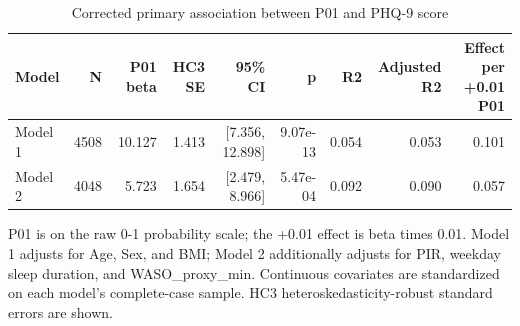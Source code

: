 \begin{table}[!htbp]
\centering
\small
\caption{Corrected primary association between P01 and PHQ-9 score}
\label{tab:table2_primary_corrected}
\begin{tabular}{lrrrrrrrr}
\hline
Model & N & P01 beta & HC3 SE & 95\% CI & p & R2 & Adjusted R2 & Effect per +0.01 P01 \\
\hline
Model 1 & 4508 & 10.127 & 1.413 & [7.356, 12.898] & 9.07e-13 & 0.054 & 0.053 & 0.101 \\
Model 2 & 4048 & 5.723 & 1.654 & [2.479, 8.966] & 5.47e-04 & 0.092 & 0.090 & 0.057 \\
\hline
\end{tabular}
\vspace{2pt}
\begin{minipage}{\linewidth}\footnotesize
P01 is on the raw 0-1 probability scale; the +0.01 effect is beta times 0.01. Model 1 adjusts for Age, Sex, and BMI; Model 2 additionally adjusts for PIR, weekday sleep duration, and WASO\_proxy\_min. Continuous covariates are standardized on each model's complete-case sample. HC3 heteroskedasticity-robust standard errors are shown.
\end{minipage}
\end{table}
